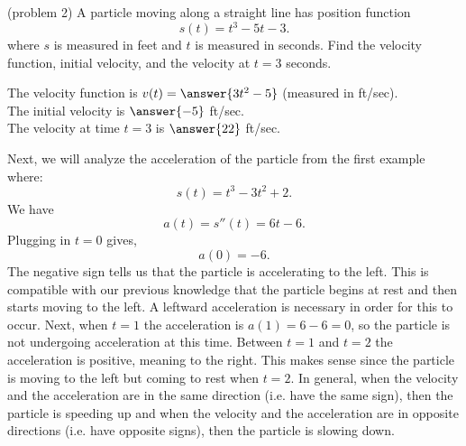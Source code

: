 \documentclass{ximera}
\begin{document}
\begin{example}[example 2]
\begin{center}
\end{center}


\begin{center}
\end{center}


\end{example}



\begin{problem}(problem 2)
A particle moving along a straight line has position function
\[s(t) = t^3 - 5t -3.\]
where $s$ is measured in feet and $t$ is measured in seconds.
Find the velocity function, initial velocity, and the velocity at $t = 3$ seconds.

The velocity function is $v(t) = \answer{3t^2 -5}$ (measured in ft/sec).\\
The initial velocity is $\answer{-5}$ ft/sec.\\
The velocity at time $t=3$ is $\answer{22}$ ft/sec.\\


\end{problem}

 

\begin{example}[example 3]
Next, we will analyze the acceleration of the particle from the first example where:
\[s(t) = t^3 - 3t^2 + 2.\]
We have
\[a(t) = s''(t) = 6t -6.\]
Plugging in $t=0$ gives,
\[a(0) = -6.\]
The negative sign tells us that the particle is accelerating to the left. 
This is compatible with our previous knowledge that the particle begins at rest and then starts moving to the left. 
A leftward acceleration is necessary in order for this to occur.
Next, when $t=1$ the acceleration is $a(1) = 6-6 = 0$, so the particle is not undergoing acceleration at this time.
Between $t=1$ and $t = 2$ the acceleration is positive, meaning to the right. 
This makes sense since the particle is moving to the left but coming to rest when $t = 2$.
In general, when the velocity and the acceleration are in the same direction (i.e. have the same sign), 
then the particle is speeding up and when
the velocity and the acceleration are in opposite directions (i.e. have opposite signs),  then the particle is slowing down.
\end{example}
\end{document}
